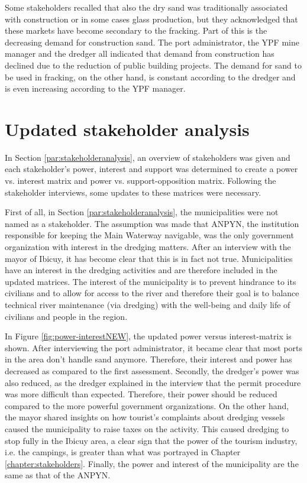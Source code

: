 Some stakeholders recalled that also the dry sand was traditionally associated with construction or in some cases glass production, but they acknowledged that these markets have become secondary to the fracking. Part of this is the decreasing demand for construction sand. The port administrator, the YPF mine manager and the dredger all indicated that demand from construction has declined due to the reduction of public building projects. The demand for sand to be used in fracking, on the other hand, is constant according to the dredger and is even increasing according to the YPF manager.

\section{Updated stakeholder analysis}
In Section \ref{par:stakeholderanalysis}, an overview of stakeholders was given and each stakeholder's power, interest and support was determined to create a power vs. interest matrix and power vs. support-opposition matrix. Following the stakeholder interviews, some updates to these matrices were necessary.

First of all, in Section \ref{par:stakeholderanalysis}, the municipalities were not named as a stakeholder. The assumption was made that ANPYN, the institution responsible for keeping the Main Waterway navigable, was the only government organization with interest in the dredging matters. After an interview with the mayor of Ibicuy, it has become clear that this is in fact not true. Municipalities have an interest in the dredging activities and are therefore included in the updated matrices. The interest of the municipality is to prevent hindrance to its civilians and to allow for access to the river and therefore their goal is to balance technical river maintenance (via dredging) with the well-being and daily life of civilians and people in the region.

In Figure \ref{fig:power-interestNEW}, the updated power versus interest-matrix is shown. After interviewing the port administrator, it became clear that most ports in the area don't handle sand anymore. Therefore, their interest and power has decreased as compared to the first assessment. Secondly, the dredger's power was also reduced, as the dredger explained in the interview that the permit procedure was more difficult than expected. Therefore, their power should be reduced compared to the more powerful government organizations. On the other hand, the mayor shared insights on how tourist's complaints about dredging vessels caused the municipality to raise taxes on the activity. This caused dredging to stop fully in the Ibicuy area, a clear sign that the power of the tourism industry, i.e. the campings, is greater than what was portrayed in Chapter \ref{chapter:stakeholders}. Finally, the power and interest of the municipality are the same as that of the ANPYN.


